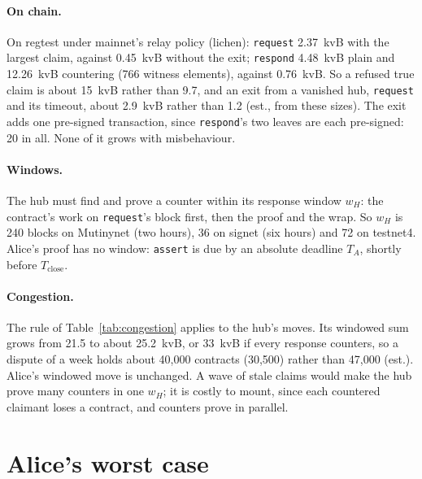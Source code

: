 \documentclass[11pt]{article}
\newcommand{\Tc}{T_{\mathrm{close}}}
\newcommand{\tx}[1]{\texttt{#1}}
\begin{document}
\paragraph{On chain.} On regtest under mainnet's relay policy (lichen):
\tx{request} 2.37~kvB with the largest claim, against 0.45~kvB without
the exit; \tx{respond} 4.48~kvB plain and 12.26~kvB countering (766
witness elements), against 0.76~kvB. So a refused true claim is about
15~kvB rather than 9.7, and an exit from a vanished hub, \tx{request}
and its timeout, about 2.9~kvB rather than 1.2 (est., from these sizes).
The exit adds one pre-signed transaction, since \tx{respond}'s two
leaves are each pre-signed: 20 in all. None of it grows with
misbehaviour.

\paragraph{Windows.} The hub must find and prove a counter within its
response window $w_H$: the contract's work on \tx{request}'s block
first, then the proof and the wrap. So $w_H$ is 240 blocks on Mutinynet
(two hours), 36 on signet (six hours) and 72 on testnet4. Alice's
proof has no window: \tx{assert} is due by an absolute deadline $T_A$,
shortly before $\Tc$.

\paragraph{Congestion.} The rule of Table~\ref{tab:congestion} applies
to the hub's moves. Its windowed sum grows from 21.5 to about 25.2~kvB,
or 33~kvB if every response counters, so a dispute of a week holds about
40,000 contracts (30,500) rather than 47,000 (est.). Alice's windowed
move is unchanged. A wave of stale claims would make the hub prove many
counters in one $w_H$; it is costly to mount, since each countered
claimant loses a contract, and counters prove in parallel.

\section{Alice's worst case}
\label{sec:worst}
\end{document}
